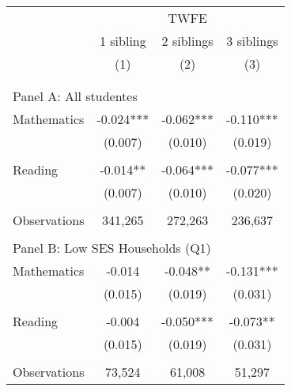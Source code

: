 \makeatletter
{}
{
\makeatother
\begin{tabular}{lccc}
\toprule
\cmidrule(lr){2-4}
& \multicolumn{3}{c}{TWFE} \\
\cmidrule(lr){2-4}
& 1 sibling & 2 siblings & 3 siblings  \\
\cmidrule(lr){2-2} \cmidrule(lr){3-3} \cmidrule(lr){4-4}
& (1) & (2) & (3)\\
\bottomrule
&  &  &  \\
&  &  &   \\
\multicolumn{4}{l}{Panel A: All studentes } \\
\hspace{3mm}Mathematics&      -0.024***&      -0.062***&      -0.110***\\
                    &     (0.007)   &     (0.010)   &     (0.019)   \\
 
&  &  &   \\
\hspace{3mm}Reading &      -0.014** &      -0.064***&      -0.077***\\
                    &     (0.007)   &     (0.010)   &     (0.020)   \\
                    &               &               &               \\
\hspace{3mm}Observations&     341,265   &     272,263   &     236,637   \\
 
&  &  &   \\
\multicolumn{4}{l}{Panel B: Low SES Households (Q1)} \\
\hspace{3mm}Mathematics&      -0.014   &      -0.048** &      -0.131***\\
                    &     (0.015)   &     (0.019)   &     (0.031)   \\
 
&  &  &   \\
\hspace{3mm}Reading &      -0.004   &      -0.050***&      -0.073** \\
                    &     (0.015)   &     (0.019)   &     (0.031)   \\
                    &               &               &               \\
\hspace{3mm}Observations&      73,524   &      61,008   &      51,297   \\
 

\end{tabular}}
